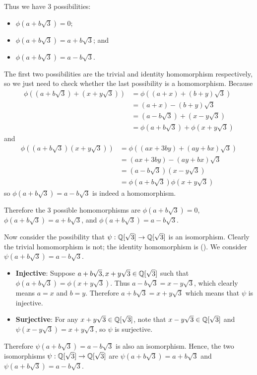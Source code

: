 \begin{questions}
    Thus we have 3 possibilities:
    \begin{itemize}
        \item $\phi(a+b\sqrt3) = 0$;
        \item $\phi(a+b\sqrt3) = a+b\sqrt3$; and
        \item $\phi(a+b\sqrt3) = a-b\sqrt3$.
    \end{itemize}
    The first two possibilities are the trivial and identity homomorphism respectively, so we just need to check whether the last possibility is a homomorphism. Because
    \begin{align*}
        \phi((a+b\sqrt3) + (x+y\sqrt3)) &= \phi((a+x)+(b+y)\sqrt3)\\
        &= (a+x)-(b+y)\sqrt3\\
        &= (a-b\sqrt3) + (x-y\sqrt3)\\
        &= \phi(a+b\sqrt3) + \phi(x+y\sqrt3)
    \end{align*}
    and
    \begin{align*}
        \phi((a+b\sqrt3)(x+y\sqrt3)) &= \phi((ax+3by)+(ay+bx)\sqrt3)\\
        &= (ax+3by)-(ay+bx)\sqrt3\\
        &= (a-b\sqrt3)(x-y\sqrt3)\\
        &= \phi(a+b\sqrt3)\phi(x+y\sqrt3)
    \end{align*}
    so $\phi(a+b\sqrt3) = a-b\sqrt3$ is indeed a homomorphism.

    Therefore the 3 possible homomorphisms are $\phi(a+b\sqrt3) = 0$, $\phi(a+b\sqrt3) = a+b\sqrt3$, and $\phi(a+b\sqrt3) = a-b\sqrt3$.

    Now consider the possibility that $\psi: \mathbb{Q}[\sqrt3] \to \mathbb{Q}[\sqrt3]$ is an isomorphism. Clearly the trivial homomorphism is not; the identity homomorphism is (). We consider $\psi(a+b\sqrt3) = a-b\sqrt3$.
    \begin{itemize}
        \item \textbf{Injective}: Suppose $a+b\sqrt3, x+y\sqrt3 \in \mathbb{Q}[\sqrt3]$ such that $\phi(a+b\sqrt3) = \phi(x+y\sqrt3)$. Thus $a - b\sqrt3 = x - y\sqrt3$, which clearly means $a = x$ and $b = y$. Therefore $a+b\sqrt3 = x+y\sqrt3$ which means that $\psi$ is injective.
        \item \textbf{Surjective}: For any $x+y\sqrt3 \in \mathbb{Q}[\sqrt3]$, note that $x-y\sqrt3 \in \mathbb{Q}[\sqrt3]$ and $\psi(x-y\sqrt3) = x+y\sqrt3$, so $\psi$ is surjective.
    \end{itemize}
    Therefore $\psi(a+b\sqrt3) = a-b\sqrt3$ is also an isomorphism. Hence, the two isomorphisms $\psi: \mathbb{Q}[\sqrt3] \to \mathbb{Q}[\sqrt3]$ are $\psi(a+b\sqrt3) = a+b\sqrt3$ and $\psi(a+b\sqrt3) = a-b\sqrt3$.


\end{questions}
